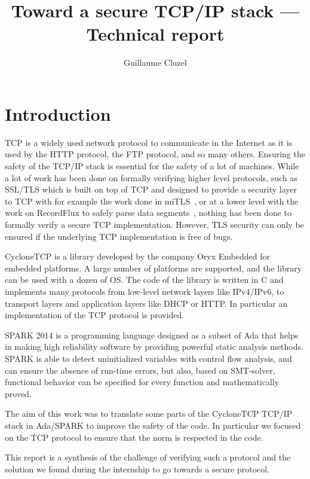 \documentclass[a4paper, 10pt]{article}
\author{Guillaume Cluzel}
\title{Toward a secure TCP/IP stack --- Technical report}
\begin{document}
    \maketitle

    \tableofcontents

    \section{Introduction}

    TCP is a widely used network protocol to communicate in the Internet as
    it is used by the HTTP protocol, the FTP protocol, and so many others.
    Ensuring the safety of the TCP/IP stack is essential for the safety of
    a lot of machines. While a lot of work has been done on formally verifying higher level
    protocols, such as SSL/TLS which is built on top of TCP and designed
    to provide a security layer to TCP with for example the work done in
    miTLS~\cite{bhargavan2013implementing}, or at a lower level with the work
    on RecordFlux to safely parse data segments~\cite{Reiher_2020}, nothing has
    been done to formally verify a secure TCP implementation. However, TLS security
    can only be ensured if the underlying TCP implementation is free of bugs.

    CycloneTCP is a library developed by the company Oryx Embedded for embedded platforms.
    A large number of platforms are supported, and the library can be used
    with a dozen of OS. The code of the library is written in C and implements
    many protocols from low-level network layers like IPv4/IPv6, to transport layers
    and application layers like DHCP or HTTP. In particular an implementation of
    the TCP protocol is provided.

    SPARK 2014 is a programming language designed as a subset of Ada that helps in
    making high reliability software by providing powerful static analysis methods.
    SPARK is able to detect uninitialized variables with control flow analysis,
    and can ensure the absence of run-time errors,
    but also, based on SMT-solver, functional behavior can be specified for every
    function and mathematically proved.

    The aim of this work was to translate some parts of the CycloneTCP TCP/IP stack
    in Ada/SPARK to improve the safety of the code. In particular we focused
    on the TCP protocol to ensure that the norm is respected in the code.

    This report is a synthesis of the challenge of verifying such a protocol
    and the solution we found during the internship to go towards a secure protocol.
\end{document}
